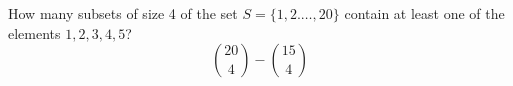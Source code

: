 \item 	How many subsets of size 4 of the set $S = \{1,2.\dots,20\}$ contain at least one of the elements $1,2,3,4,5$?
\[ \binom{20}{4} - \binom{15}{4} \]